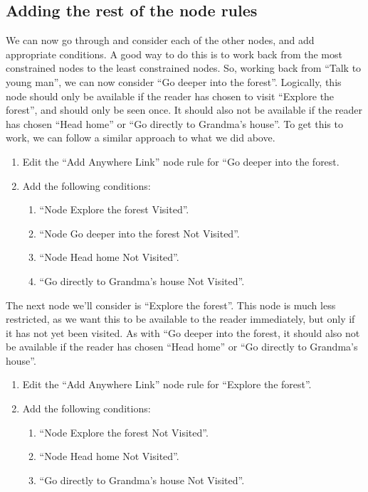 \documentclass{article}
\begin{document}
\subsection{Adding the rest of the node rules}

We can now go through and consider each of the other nodes, and add appropriate conditions. A good way to do this is to work back from the most constrained nodes to the least constrained nodes. So, working back from ``Talk to young man'', we can now consider ``Go deeper into the forest''. Logically, this node should only be available if the reader has chosen to visit ``Explore the forest'', and should only be seen once. It should also not be available if the reader has chosen ``Head home'' or ``Go directly to Grandma's house''. To get this to work, we can follow a similar approach to what we did above.

\begin{enumerate}
  \item Edit the ``Add Anywhere Link'' node rule for ``Go deeper into the
  forest.
  \item Add the following conditions:
  \begin{enumerate}
  \item ``Node Explore the forest Visited''.
  \item ``Node Go deeper into the forest Not Visited''.
  \item ``Node Head home Not Visited''.
  \item ``Go directly to Grandma's house Not Visited''.
  \end{enumerate}
\end{enumerate}

The next node we'll consider is ``Explore the forest''. This node is much less restricted, as we want this to be available to the reader immediately, but only if it has not yet been visited. As with ``Go deeper into the forest, it should also not be available if the reader has chosen ``Head home'' or ``Go directly to Grandma's house''.

\begin{enumerate}
  \item Edit the ``Add Anywhere Link'' node rule for ``Explore the forest''.
  \item Add the following conditions: 
  \begin{enumerate}
  \item ``Node Explore the forest Not Visited''.
  \item ``Node Head home Not Visited''.
  \item ``Go directly to Grandma's house Not Visited''.
\end{enumerate}
\end{enumerate}
\end{document}
